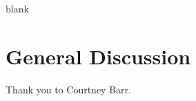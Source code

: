 \documentclass[smallextended]{svjour3}       %
\begin{document}
blank



\section{General Discussion}
\label{sec:discussion}


\begin{acknowledgements}
Thank you to Courtney Barr. 
\end{acknowledgements}




\end{document}
